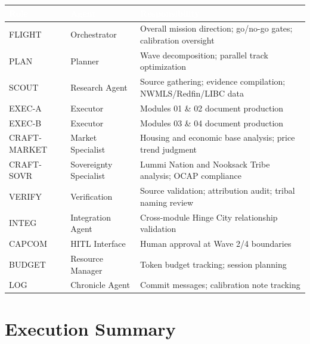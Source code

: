 \documentclass[11pt,letterpaper]{article}
\newcommand{\tableheader}[1]{\textbf{\sffamily\textcolor{white}{#1}}}
\begin{document}
\begin{center}
\begin{tabularx}{\textwidth}{L{2.5cm}L{3cm}X}
\toprule
{}
\tableheader{Role} & \tableheader{Agent} & \tableheader{Responsibility} \\
\midrule
FLIGHT & Orchestrator & Overall mission direction; go/no-go gates; calibration oversight \\
PLAN & Planner & Wave decomposition; parallel track optimization \\
SCOUT & Research Agent & Source gathering; evidence compilation; NWMLS/Redfin/LIBC data \\
EXEC-A & Executor & Modules 01 \& 02 document production \\
EXEC-B & Executor & Modules 03 \& 04 document production \\
CRAFT-MARKET & Market Specialist & Housing and economic base analysis; price trend judgment \\
CRAFT-SOVR & Sovereignty Specialist & Lummi Nation and Nooksack Tribe analysis; OCAP compliance \\
VERIFY & Verification & Source validation; attribution audit; tribal naming review \\
INTEG & Integration Agent & Cross-module Hinge City relationship validation \\
CAPCOM & HITL Interface & Human approval at Wave 2/4 boundaries \\
BUDGET & Resource Manager & Token budget tracking; session planning \\
LOG & Chronicle Agent & Commit messages; calibration note tracking \\
\bottomrule
\end{tabularx}
\end{center}

\section{Execution Summary}
\end{document}
